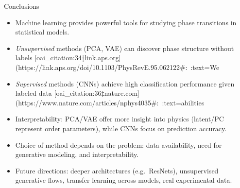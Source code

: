 \documentclass{beamer}
\begin{document}
\begin{frame}{Conclusions}
 \begin{itemize}
   \item Machine learning provides powerful tools for studying phase transitions in statistical models.
   \item \emph{Unsupervised} methods (PCA, VAE) can discover phase structure without labels [oai_citation:34‡link.aps.org](https://link.aps.org/doi/10.1103/PhysRevE.95.062122#:~:text=We%
   \item \emph{Supervised} methods (CNNs) achieve high classification performance given labeled data [oai_citation:36‡nature.com](https://www.nature.com/articles/nphys4035#:~:text=abilities%
   \item Interpretability: PCA/VAE offer more insight into physics (latent/PC represent order parameters), while CNNs focus on prediction accuracy.
   \item Choice of method depends on the problem: data availability, need for generative modeling, and interpretability.
   \item Future directions: deeper architectures (e.g.\ ResNets), unsupervised generative flows, transfer learning across models, real experimental data.
 \end{itemize}
\end{frame}
\end{document}
